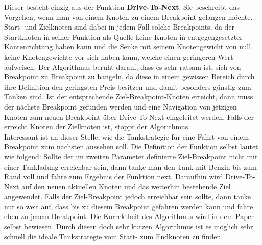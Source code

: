 \documentclass[11pt]{article}
\begin{document}
	Dieser besteht einzig aus der Funktion \textbf{Drive-To-Next}. Sie beschreibt das Vorgehen, wenn man von einem Knoten zu einem Breakpoint gelangen möchte. Start- und Zielknoten sind dabei in jedem Fall solche Breakpoints, da der Startknoten in seiner Funktion als Quelle keine Knoten in entgegengesetzter Kantenrichtung haben kann und die Senke mit seinem Knotengewicht von null keine Knotengewichte vor sich haben kann, welche einen geringeren Wert aufweisen. Der Algorithmus beruht darauf, dass es sehr ratsam ist, sich von Breakpoint zu Breakpoint zu hangeln, da diese in einem gewissen Bereich durch ihre Definition den geringsten Preis besitzen und damit besonders günstig zum Tanken sind. Ist der entsprechende Ziel-Breakpoint-Knoten erreicht, dann muss der nächste Breakpoint gefunden werden und eine Navigation von jetzigen Knoten zum neuen Breakpoint über Drive-To-Next eingeleitet werden. Falls der erreicht Knoten der Zielknoten ist, stoppt der Algorithmus. \\
	Interessant ist an dieser Stelle, wie die Tankstrategie für eine Fahrt von einem Breakpoint zum nächsten aussehen soll. Die Definition der Funktion selbst lautet wie folgend: Sollte der im zweiten Parameter definierte Ziel-Breakpoint nicht mit einer Tankladung erreichbar sein, dann tanke man den Tank mit Benzin bis zum Rand voll und fahre zum Ergebnis der Funktion next. Daraufhin wird Drive-To-Next auf den neuen aktuellen Knoten und das weiterhin bestehende Ziel angewendet. Falls der Ziel-Breakpoint jedoch erreichbar sein sollte, dann tanke nur so weit auf, dass bis zu diesem Breakpoint gefahren werden kann und fahre eben zu jenem Breakpoint. Die Korrektheit des Algorithmus wird in dem Paper selbst bewiesen. Durch diesen doch sehr kurzen Algorithmus ist es möglich sehr schnell die ideale Tankstrategie vom Start- zum Endknoten zu finden.
	
\end{document}
